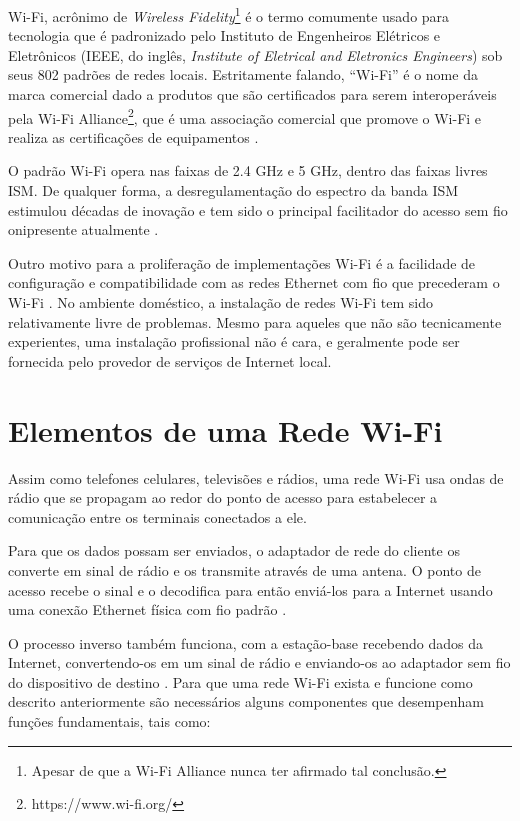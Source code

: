 Wi-Fi, acrônimo de \textit{Wireless Fidelity}\footnote[3]{Apesar de que a Wi-Fi Alliance nunca ter afirmado tal conclusão.} é o termo comumente usado para tecnologia que é padronizado pelo Instituto de Engenheiros Elétricos e Eletrônicos (IEEE, do inglês, \textit{Institute of Eletrical and Eletronics Engineers}) sob seus 802 padrões de redes locais. Estritamente falando, ``Wi-Fi'' é o nome da marca comercial dado a produtos que são certificados para serem interoperáveis pela Wi-Fi Alliance\footnote[4]{https://www.wi-fi.org/}, que é uma associação comercial que promove o Wi-Fi e realiza as certificações de equipamentos \cite{gorshe2014ieee}.

O padrão Wi-Fi opera nas faixas de 2.4 GHz e 5 GHz, dentro das faixas livres ISM. De qualquer forma, a desregulamentação do espectro da banda ISM estimulou décadas de inovação e tem sido o principal facilitador do acesso sem fio onipresente atualmente \cite{gorshe2014ieee}.

Outro motivo para a proliferação de implementações Wi-Fi é a facilidade de configuração e compatibilidade com as redes Ethernet com fio que precederam o Wi-Fi \cite{gorshe2014ieee}. No ambiente doméstico, a instalação de redes Wi-Fi tem sido relativamente livre de problemas. Mesmo para aqueles que não são tecnicamente experientes, uma instalação profissional não é cara, e geralmente pode ser fornecida pelo provedor de serviços de Internet local.

\section{Elementos de uma Rede Wi-Fi}
\label{elementos-rede-wifi}

Assim como telefones celulares, televisões e rádios, uma rede Wi-Fi usa ondas de rádio que se propagam ao redor do ponto de acesso para estabelecer a comunicação entre os terminais conectados a ele.

Para que os dados possam ser enviados, o adaptador de rede do cliente os converte em sinal de rádio e os transmite através de uma antena. O ponto de acesso recebe o sinal e o decodifica para então enviá-los para a Internet usando uma conexão Ethernet física com fio padrão \cite{brain2001}.

O processo inverso também funciona, com a estação-base recebendo dados da Internet, convertendo-os em um sinal de rádio e enviando-os ao adaptador sem fio do dispositivo de destino \cite{brain2001}.
Para que uma rede Wi-Fi exista e funcione como descrito anteriormente são necessários alguns componentes que desempenham funções fundamentais, tais como:

